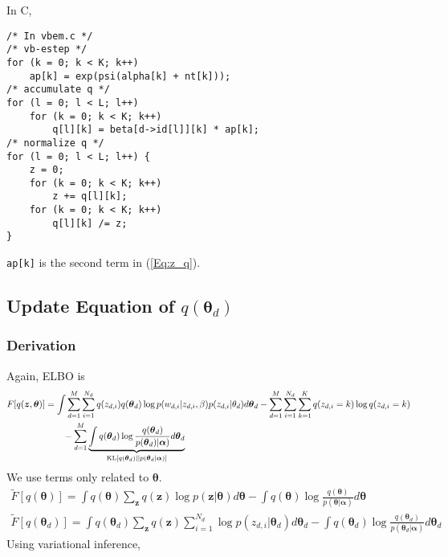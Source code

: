 \documentclass[a4paper,10.5pt,dvipdfmx]{jarticle}  %
\begin{document}
In C,
\begin{lstlisting}[style=C]
/* In vbem.c */
/* vb-estep */
for (k = 0; k < K; k++)
	ap[k] = exp(psi(alpha[k] + nt[k]));
/* accumulate q */
for (l = 0; l < L; l++)
	for (k = 0; k < K; k++)
		q[l][k] = beta[d->id[l]][k] * ap[k];
/* normalize q */
for (l = 0; l < L; l++) {
	z = 0;
	for (k = 0; k < K; k++)
		z += q[l][k];
	for (k = 0; k < K; k++)
		q[l][k] /= z;
}
\end{lstlisting}
\texttt{ap[k]} is the second term in (\ref{Eq:z_q}).



\subsection{Update Equation of $q(\boldsymbol{\theta}_d)$}
\subsubsection{Derivation}
Again, ELBO is
\begin{align}
	F[q(\boldsymbol{z}, \boldsymbol{\theta})]  &= \int \sum_{d=1}^{M} \sum_{i=1}^{N_d} q(z_{d,i}) q(\boldsymbol{\theta}_d) \log p(w_{d,i} | z_{d,i}, \beta) p(z_{d,i} | \theta_{d}) d \boldsymbol{\theta}_d - \sum_{d=1}^{M} \sum_{i=1}^{N_d} \sum_{k=1}^{K} q(z_{d,i} = k) \log q(z_{d,i} = k) \\ &\qquad - \sum_{d=1}^{M} \underbrace{\int q(\boldsymbol{\theta}_d) \log \frac{q(\boldsymbol{\theta}_d)}{p(\boldsymbol{\theta}_d) | \boldsymbol{\alpha})} d \boldsymbol{\theta}_d}_{{\rm KL}\left[ q(\boldsymbol{\theta}_d) || p(\boldsymbol{\theta}_d | \boldsymbol{\alpha}) \right]} \nonumber
\end{align}
We use terms only related to $\boldsymbol{\theta}$.
\begin{align}
	\widetilde{F}[q(\boldsymbol{\theta})] = \int q(\boldsymbol{\theta}) \sum_{\boldsymbol{z}} q(\boldsymbol{z}) \log p(\boldsymbol{z} | \boldsymbol{\theta}) d \boldsymbol{\theta} - \int q(\boldsymbol{\theta}) \log \frac{q(\boldsymbol{\theta})}{p(\boldsymbol{\theta} | \boldsymbol{\alpha})} d \boldsymbol{\theta} \\
	\widetilde{F}[q(\boldsymbol{\theta}_d)] = \int q(\boldsymbol{\theta}_d) \sum_{\boldsymbol{z}} q(\boldsymbol{z}) \sum_{i=1}^{N_d} \log p(z_{d,i} | \boldsymbol{\theta}_d) d \boldsymbol{\theta}_d - \int q(\boldsymbol{\theta}_d) \log \frac{q(\boldsymbol{\theta}_d)}{p(\boldsymbol{\theta}_d | \boldsymbol{\alpha})} d \boldsymbol{\theta}_d
\end{align}
Using variational inference,
\end{document}
